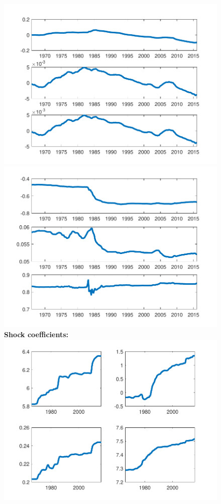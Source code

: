\documentclass[12pt,reqno]{article}
\numberwithin{equation}{section}
\begin{document}
\begin{figure}[H]
\includegraphics[scale=0.6]{NKPC_filter_init_MSV_alphas.pdf}
\includegraphics[scale=0.6]{NKPC_filter_init_MSV_betas.pdf}\\

\textbf{Shock coefficients:}\\

\includegraphics[scale=0.6]{NKPC_filter_init_MSV_shockCoef.pdf}\\


\end{figure}
\end{document}

